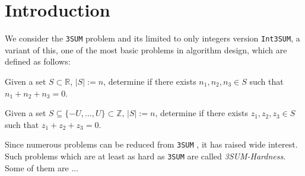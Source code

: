 \section{Introduction}
\label{s:introduction}
We consider the \texttt{3SUM} problem and its limited to only integers version \texttt{Int3SUM}, a variant of this, one of the most basic problems in algorithm design, which are defined as follows:

\begin{definition}
    Given a set $S \subset \mathbb{R}$, $|S| := n$, determine if there exists $n_{1}, n_{2}, n_{3} \in S$ such that $n_{1} + n_{2} + n_{3} = 0$.
\label{def:3sum}
\end{definition}

\begin{definition}
    Given a set $S \subseteq \{-U, \dots, U\} \subset \mathbb{Z}$, $|S| := n$, determine if there exists $z_{1}, z_{2}, z_{3} \in S$ such that $z_{1} + z_{2} + z_{3} = 0$.
\label{def:int3sum}
\end{definition}

Since numerous problems can be reduced from \texttt{3SUM} \cite{gajentaan1995class} \cite{barequet2001polygon}, it has raised wide interest. Such problems which are at least as hard as \texttt{3SUM} are called \textit{3SUM-Hardness}. Some of them are ...

